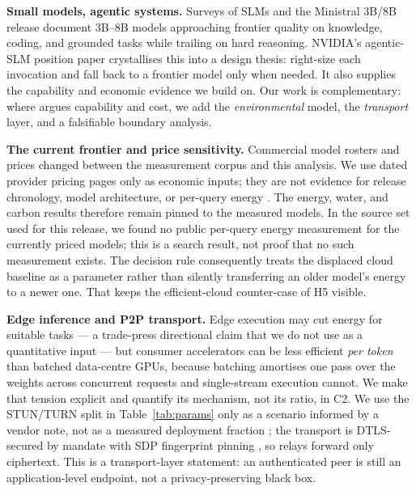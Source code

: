 \documentclass[conference]{IEEEtran}
\begin{document}
\textbf{Small models, agentic systems.}
Surveys of SLMs \cite{wang2024slm} and the Ministral 3B/8B release
\cite{mistral2024} document 3B--8B models approaching frontier quality on
knowledge, coding, and grounded tasks while trailing on hard reasoning. NVIDIA's
agentic-SLM position paper \cite{belcak2025} crystallises this into a design
thesis: right-size each invocation and fall back to a frontier model only when
needed. It also supplies the capability and economic evidence we build on. Our work
is complementary: where \cite{belcak2025} argues capability and cost, we add the
\emph{environmental} model, the \emph{transport} layer, and a falsifiable
boundary analysis.

\textbf{The current frontier and price sensitivity.}
Commercial model rosters and prices changed between the measurement corpus and
this analysis. We use dated provider pricing pages only as economic inputs;
they are not evidence for release chronology, model architecture, or per-query
energy \cite{frontier2026,anthropic_pricing2026,google_pricing2026}. The energy,
water, and carbon results therefore remain pinned to the measured models. In the
source set used for this release, we found no public per-query energy measurement
for the currently priced models; this is a search result, not proof that no such
measurement exists. The decision rule consequently treats the displaced cloud
baseline as a parameter rather than silently transferring an older model's
energy to a newer one. That keeps the efficient-cloud counter-case of H5 visible.

\textbf{Edge inference and P2P transport.}
Edge execution may cut energy for suitable tasks
\cite{techtarget2025} --- a trade-press directional claim that we do not use
as a quantitative input --- but consumer accelerators can be less efficient
\emph{per token} than batched data-centre GPUs, because batching amortises one
pass over the weights across concurrent requests and single-stream execution
cannot. We make that tension explicit and quantify its mechanism, not its
ratio, in C2. We use the STUN/TURN split in Table~\ref{tab:params} only as a
scenario informed by a vendor note, not as a measured deployment fraction
\cite{antmedia2026}; the
transport is DTLS-secured by mandate with SDP fingerprint pinning
\cite{rfc8831,rfc8827}, so relays forward only ciphertext. This is a
transport-layer statement: an authenticated peer is still an application-level
endpoint, not a privacy-preserving black box.
\end{document}
